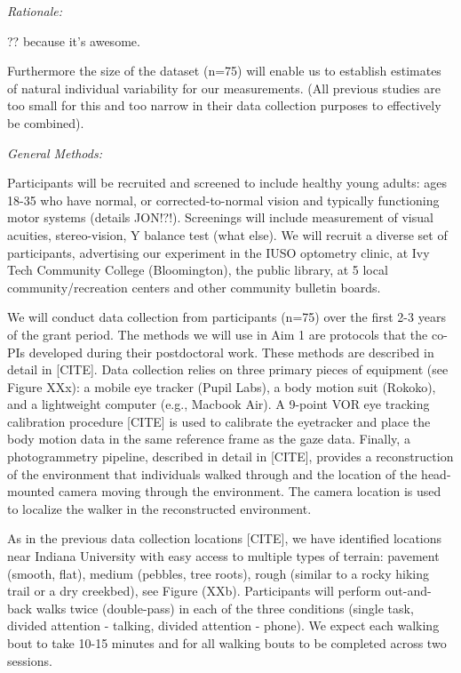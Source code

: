 

\emph{Rationale:}

?? because it's awesome.

Furthermore the size of the dataset (n=75) will enable us to establish
estimates of natural individual variability for our measurements. (All
previous studies are too small for this and too narrow in their data
collection purposes to effectively be combined).

\emph{General Methods:}

Participants will be recruited and screened to include healthy young
adults: ages 18-35 who have normal, or corrected-to-normal vision and
typically functioning motor systems (details JON!?!). Screenings will
include measurement of visual acuities, stereo-vision, Y balance test
(what else). We will recruit a diverse set of participants, advertising
our experiment in the IUSO optometry clinic, at Ivy Tech Community
College (Bloomington), the public library, at 5 local
community/recreation centers and other community bulletin boards.

We will conduct data collection from participants (n=75) over the first
2-3 years of the grant period. The methods we will use in Aim 1 are
protocols that the co-PIs developed during their postdoctoral work.
These methods are described in detail in {[}CITE{]}. Data collection
relies on three primary pieces of equipment (see Figure XXx): a mobile
eye tracker (Pupil Labs), a body motion suit (Rokoko), and a lightweight
computer (e.g., Macbook Air). A 9-point VOR eye tracking calibration
procedure {[}CITE{]} is used to calibrate the eyetracker and place the
body motion data in the same reference frame as the gaze data. Finally,
a photogrammetry pipeline, described in detail in {[}CITE{]}, provides a
reconstruction of the environment that individuals walked through and
the location of the head-mounted camera moving through the environment.
The camera location is used to localize the walker in the reconstructed
environment.

As in the previous data collection locations {[}CITE{]}, we have
identified locations near Indiana University with easy access to
multiple types of terrain: pavement (smooth, flat), medium (pebbles,
tree roots), rough (similar to a rocky hiking trail or a dry creekbed),
see Figure (XXb). Participants will perform out-and-back walks twice
(double-pass) in each of the three conditions (single task, divided
attention - talking, divided attention - phone). We expect each walking
bout to take 10-15 minutes and for all walking bouts to be completed
across two sessions.

